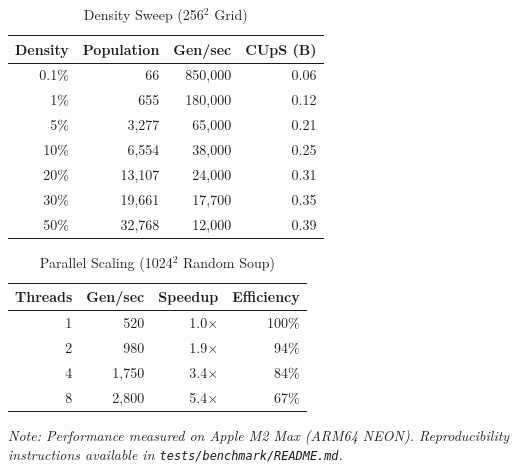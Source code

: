 \documentclass[11pt]{article}
\theoremstyle{definition}
\begin{document}
    \begin{table}[h]
        \centering
        \caption{Density Sweep (256$^2$ Grid)}
        \begin{tabular}{@{}rrrr@{}}
            \toprule
            \textbf{Density} & \textbf{Population} & \textbf{Gen/sec} & \textbf{CUpS (B)} \\
            \midrule
            0.1\% & 66 & 850,000 & 0.06 \\
            1\% & 655 & 180,000 & 0.12 \\
            5\% & 3,277 & 65,000 & 0.21 \\
            10\% & 6,554 & 38,000 & 0.25 \\
            20\% & 13,107 & 24,000 & 0.31 \\
            30\% & 19,661 & 17,700 & 0.35 \\
            50\% & 32,768 & 12,000 & 0.39 \\
            \bottomrule
        \end{tabular}
    \end{table}

    \begin{table}[h]
        \centering
        \caption{Parallel Scaling (1024$^2$ Random Soup)}
        \begin{tabular}{@{}rrrr@{}}
            \toprule
            \textbf{Threads} & \textbf{Gen/sec} & \textbf{Speedup} & \textbf{Efficiency} \\
            \midrule
            1 & 520 & 1.0$\times$ & 100\% \\
            2 & 980 & 1.9$\times$ & 94\% \\
            4 & 1,750 & 3.4$\times$ & 84\% \\
            8 & 2,800 & 5.4$\times$ & 67\% \\
            \bottomrule
        \end{tabular}
    \end{table}

    \textit{Note: Performance measured on Apple M2 Max (ARM64 NEON). Reproducibility instructions available in \texttt{tests/benchmark/README.md}.}
\end{document}

